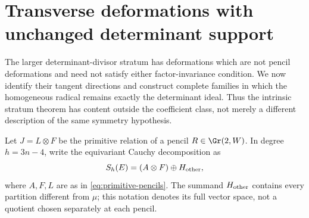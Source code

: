 \documentclass[11pt,reqno]{amsart}
\numberwithin{equation}{section}
\theoremstyle{definition}\newtheorem{definition}[theorem]{Definition}
\theoremstyle{remark}\newtheorem{remark}[theorem]{Remark}
\begin{document}
\section{Transverse deformations with unchanged determinant support}
\label{sec:transverse-relations}

The larger determinant-divisor stratum has deformations which are
not pencil deformations and need not satisfy either factor-invariance
condition.  We now identify their tangent directions and construct
complete families in which the homogeneous radical remains exactly
the determinant ideal.  Thus the intrinsic stratum theorem has content
outside the coefficient class, not merely a different description
of the same symmetry hypothesis.

Let \(J=L\otimes F\) be the primitive relation of a pencil
\(R\in\Gr(2,W)\).  In degree \(h=3n-4\), write the equivariant
Cauchy decomposition as
\[
                    S_h(E)=(A\otimes F)\oplus H_{\rm other},
\]
where \(A,F,L\) are as in \eqref{eq:primitive-pencils}.
The summand \(H_{\rm other}\) contains every partition different
from \(\mu\); this notation denotes its full vector space, not a
quotient chosen separately at each pencil.
\end{document}
